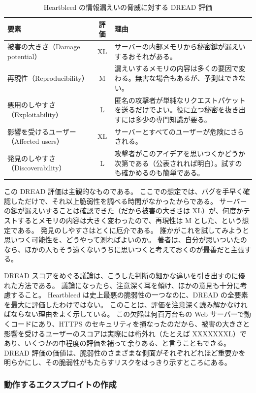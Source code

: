 \documentclass[uplatex]{jsarticle}
\def\label#1{}%
\begin{document}
\begin{table}[H]
\centering
\small
\begin{tabularx}{\linewidth}{|l|c|X|}
\hline
要素 & 評価 & 理由 \\ \hline
被害の大きさ（Damage potential） & XL & サーバーの内部メモリから秘密鍵が漏えいするおそれがある。 \\ \hline
再現性（Reproducibility） & M & 漏えいするメモリの内容は多くの要因で変わる。無害な場合もあるが、予測はできない。 \\ \hline
悪用のしやすさ（Exploitability） & L & 匿名の攻撃者が単純なリクエストパケットを送るだけでよい。役に立つ秘密を抜き出すには多少の専門知識が要る。 \\ \hline
影響を受けるユーザー（Affected users） & XL & サーバーとすべてのユーザーが危険にさらされる。 \\ \hline
発見のしやすさ（Discoverability） & L & 攻撃者がこのアイデアを思いつくかどうか次第である（公表されれば明白）。試すのも確かめるのも簡単である。 \\ \hline
\end{tabularx}
\caption{Heartbleed の情報漏えいの脅威に対する DREAD 評価}\label{tab:ch13-heartbleed-dread}
\end{table}

この DREAD 評価は主観的なものである。
ここでの想定では、バグを手早く確認しただけで、それ以上脆弱性を調べる時間がなかったからである。
サーバーの鍵が漏えいすることは確認できた（だから被害の大きさは XL）が、何度かテストするとメモリの内容は大きく変わったので、再現性は M とした、という想定である。
発見のしやすさはとくに厄介である。
誰かがこれを試してみようと思いつく可能性を、どうやって測ればよいのか。
著者は、自分が思いついたのなら、ほかの人もそう遠くないうちに思いつくと考えておくのが最善だと主張する。

DREAD スコアをめぐる議論は、こうした判断の細かな違いを引き出すのに優れた方法である。
議論になったら、注意深く耳を傾け、ほかの意見も十分に考慮すること。
Heartbleed は史上最悪の脆弱性の一つなのに、DREAD の全要素を最大に評価したわけではない。
このことは、評価を注意深く読み解かなければならない理由をよく示している。
この欠陥は何百万台もの Web サーバーで動くコードにあり、HTTPS のセキュリティを損なったのだから、被害の大きさと影響を受けるユーザーのスコアは実際には桁外れ（たとえば XXXXXXXL）であり、いくつかの中程度の評価を補って余りある、と言うこともできる。
DREAD 評価の価値は、脆弱性のさまざまな側面がそれぞれどれほど重要かを明らかにし、その脆弱性がもたらすリスクをはっきり示すところにある。

\subsubsection{動作するエクスプロイトの作成}
\end{document}
